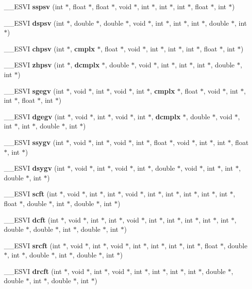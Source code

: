 \begin{CompactItemize}
\item 
\_\-\_\-ESVI {\bf sspsv} (int $\ast$, float $\ast$, float $\ast$, void $\ast$, int $\ast$, int $\ast$, int $\ast$, float $\ast$, int $\ast$)
\item 
\_\-\_\-ESVI {\bf dspsv} (int $\ast$, double $\ast$, double $\ast$, void $\ast$, int $\ast$, int $\ast$, int $\ast$, double $\ast$, int $\ast$)
\item 
\_\-\_\-ESVI {\bf chpsv} (int $\ast$, {\bf cmplx} $\ast$, float $\ast$, void $\ast$, int $\ast$, int $\ast$, int $\ast$, float $\ast$, int $\ast$)
\item 
\_\-\_\-ESVI {\bf zhpsv} (int $\ast$, {\bf dcmplx} $\ast$, double $\ast$, void $\ast$, int $\ast$, int $\ast$, int $\ast$, double $\ast$, int $\ast$)
\item 
\_\-\_\-ESVI {\bf sgegv} (int $\ast$, void $\ast$, int $\ast$, void $\ast$, int $\ast$, {\bf cmplx} $\ast$, float $\ast$, void $\ast$, int $\ast$, int $\ast$, float $\ast$, int $\ast$)
\item 
\_\-\_\-ESVI {\bf dgegv} (int $\ast$, void $\ast$, int $\ast$, void $\ast$, int $\ast$, {\bf dcmplx} $\ast$, double $\ast$, void $\ast$, int $\ast$, int $\ast$, double $\ast$, int $\ast$)
\item 
\_\-\_\-ESVI {\bf ssygv} (int $\ast$, void $\ast$, int $\ast$, void $\ast$, int $\ast$, float $\ast$, void $\ast$, int $\ast$, int $\ast$, float $\ast$, int $\ast$)
\item 
\_\-\_\-ESVI {\bf dsygv} (int $\ast$, void $\ast$, int $\ast$, void $\ast$, int $\ast$, double $\ast$, void $\ast$, int $\ast$, int $\ast$, double $\ast$, int $\ast$)
\item 
\_\-\_\-ESVI {\bf scft} (int $\ast$, void $\ast$, int $\ast$, int $\ast$, void $\ast$, int $\ast$, int $\ast$, int $\ast$, int $\ast$, int $\ast$, float $\ast$, double $\ast$, int $\ast$, double $\ast$, int $\ast$)
\item 
\_\-\_\-ESVI {\bf dcft} (int $\ast$, void $\ast$, int $\ast$, int $\ast$, void $\ast$, int $\ast$, int $\ast$, int $\ast$, int $\ast$, int $\ast$, double $\ast$, double $\ast$, int $\ast$, double $\ast$, int $\ast$)
\item 
\_\-\_\-ESVI {\bf srcft} (int $\ast$, void $\ast$, int $\ast$, void $\ast$, int $\ast$, int $\ast$, int $\ast$, int $\ast$, float $\ast$, double $\ast$, int $\ast$, double $\ast$, int $\ast$, double $\ast$, int $\ast$)
\item 
\_\-\_\-ESVI {\bf drcft} (int $\ast$, void $\ast$, int $\ast$, void $\ast$, int $\ast$, int $\ast$, int $\ast$, int $\ast$, double $\ast$, double $\ast$, int $\ast$, double $\ast$, int $\ast$)

\end{CompactItemize}
